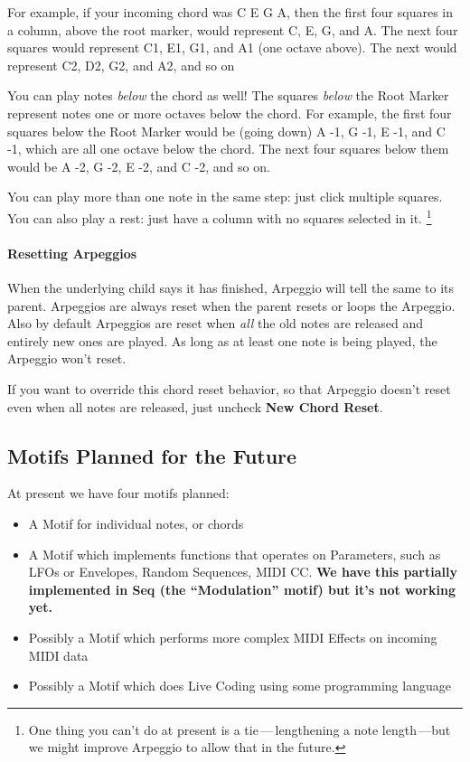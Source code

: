 \documentclass[twoside,10pt]{article}
\begin{document}
For example, if your incoming chord was C E G A, then the first four squares in a column, above the root marker, would represent C, E, G, and A.  The next four squares would represent C1, E1, G1, and A1 (one octave above).  The next would represent C2, D2, G2, and A2, and so on

You can play notes {\it below} the chord as well!  The squares {\it below} the Root Marker represent notes one or more octaves below the chord.  For example, the first four squares below the Root Marker would be (going down) A -1, G -1, E -1, and C -1, which are all one octave below the chord.  The next four squares below them would be A -2, G -2, E -2, and C -2, and so on.

You can play more than one note in the same step: just click multiple squares.  You can also play a rest: just have a column with no squares selected in it.  \footnote{One thing you can't do at present is a tie\,---\,lengthening a note length\,---but we might improve Arpeggio to allow that in the future.}

\paragraph{Resetting Arpeggios}

When the underlying child says it has finished, Arpeggio will tell the same to its parent.  Arpeggios are always reset when the parent resets or loops the Arpeggio.  Also by default Arpeggios are reset when {\it all} the old notes are released and entirely new ones are played. As long as at least one note is being played, the Arpeggio won't reset.

If you want to override this chord reset behavior, so that Arpeggio doesn't reset even when all notes are released, just uncheck {\bf New Chord Reset}.

\clearpage\subsection{Motifs Planned for the Future}

At present we have four motifs planned:

\begin{itemize}
\item A Motif for individual notes, or chords
\item A Motif which implements functions that operates on Parameters, such as LFOs or Envelopes, Random Sequences, MIDI CC.  {\bf \color{red} We have this partially implemented in Seq (the ``Modulation'' motif) but it's not working yet.}
\item Possibly a Motif which performs more complex MIDI Effects on incoming MIDI data
\item Possibly a Motif which does Live Coding using some programming language
\end{itemize}
\end{document}
